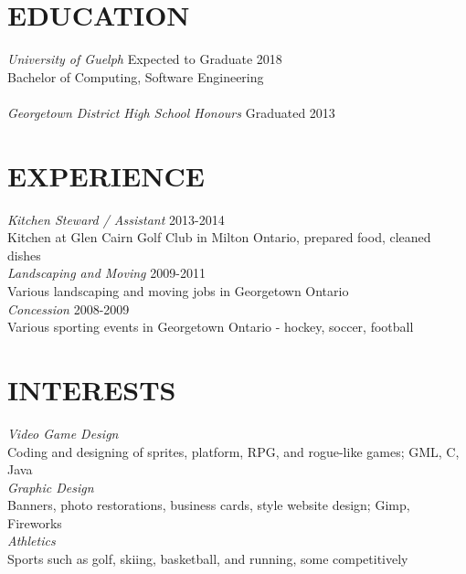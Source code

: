 \documentclass[line, margin]{res}
\begin{document}
\begin{resume}
\section{EDUCATION}
{\color{darkgrey}
\textit{University of Guelph} \hfill Expected to Graduate 2018\\
Bachelor of Computing, Software Engineering\\\\
\textit{Georgetown District High School Honours} \hfill Graduated 2013\\}

\section{EXPERIENCE}
{\color{darkgrey}\textit{Kitchen Steward / Assistant} \hfill 2013-2014 \\
Kitchen at Glen Cairn Golf Club in Milton Ontario, prepared food, cleaned dishes \\ [10pt]
\textit{Landscaping and Moving} \hfill 2009-2011 \\
Various landscaping and moving jobs in Georgetown Ontario\\ [10pt]
\textit{Concession} \hfill 2008-2009 \\
Various sporting events in Georgetown Ontario - hockey, soccer, football\\ 
}

\section{INTERESTS}
{\color{darkgrey}\textit{Video Game Design} \\
Coding and designing of sprites, platform, RPG, and rogue-like games; GML, C, Java\\ [10pt]
\textit{Graphic Design} \\
Banners, photo restorations, business cards, style website design; Gimp, Fireworks\\ [10pt]	
\textit{Athletics} \\
Sports such as golf, skiing, basketball, and running, some competitively
}

\end{resume}
\end{document}

